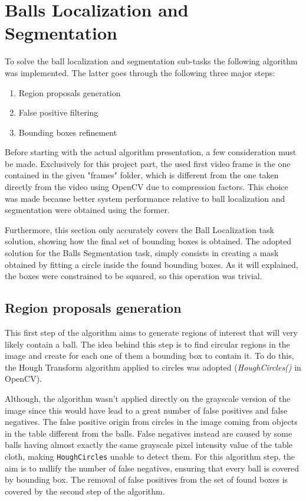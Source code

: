 \section{Balls Localization and Segmentation}

To solve the ball localization and segmentation sub-tasks the following algorithm was implemented.
The latter goes through the following three major steps:
\begin{enumerate}
    \item Region proposals generation
    \item False positive filtering
    \item Bounding boxes refinement
\end{enumerate}

Before starting with the actual algorithm presentation, a few consideration must be made.
Exclusively for this project part, the used first video frame is the one contained in the given "frames" folder, which is different
from the one taken directly from the video using OpenCV due to compression factors. This choice was made because better system performance relative to 
ball localization and segmentation were obtained using the former.

Furthermore, this section only accurately covers the Ball Localization task solution, showing how the final set of bounding boxes is obtained.
The adopted solution for the Balls Segmentation task, simply consists in creating a mask obtained by fitting a circle inside the found bounding boxes.
As it will explained, the boxes were constrained to be squared, so this operation was trivial.


\subsection{Region proposals generation}
This first step of the algorithm aims to generate regions of interest that will very likely 
contain a ball. The idea behind this step is to find circular regions in the image and create for each one of them
a bounding box to contain it. To do this, the Hough Transform algorithm applied to circles was adopted
(\textit{HoughCircles()} in OpenCV).

Although, the algorithm wasn't applied directly on the grayscale version of the image since
this would have lead to a great number of false positives and false negatives. 
The false positive origin from circles in the image coming from objects in the table different from the balls.
False negatives instead are caused by some balls having almost exactly the same grayscale pixel intensity value of the table cloth,
making \verb|HoughCircles| unable to detect them.
For this algorithm step, the aim is to nullify the number of false negatives, ensuring that every ball is covered by bounding box.
The removal of false positives from the set of found boxes is covered by the second step of the algorithm.


